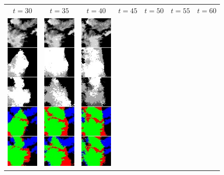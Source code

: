 \begin{figure}[h]
\begin{tabular}{lllllll}
\multicolumn{1}{c}{$t = 30 $}  &
\multicolumn{1}{c}{$t = 35$}  &
\multicolumn{1}{c}{$t = 40$}  &
\multicolumn{1}{c}{$t = 45$}  &
\multicolumn{1}{c}{$t = 50$}  &
\multicolumn{1}{c}{$t = 55$}  &
\multicolumn{1}{c}{$t = 60$}  \\
\includegraphics[width=20mm]{abb/prediction/100_cat_maxCont}&
\includegraphics[width=20mm]{abb/prediction/101_cat_maxCont}&
\includegraphics[width=20mm]{abb/prediction/102_cat_maxCont}&

\end{tabular}
\end{figure}
